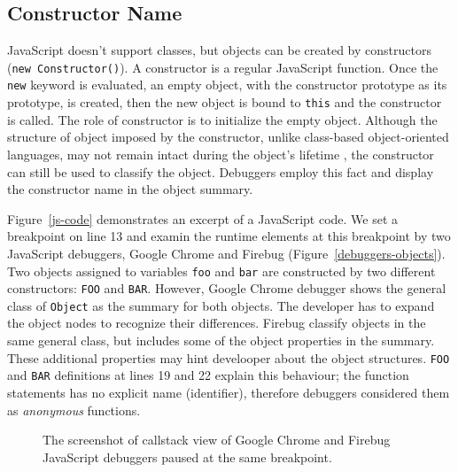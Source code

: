 \documentclass[conference]{IEEEtran}
\begin{document}
\subsection{Constructor Name}
JavaScript doesn't support classes, but objects can be created by constructors ({\small\texttt{new Constructor()}}). A constructor is a regular JavaScript function. Once the {\small\texttt{new}} keyword is evaluated, an empty object, with the constructor prototype as its prototype, is created, then the new object is bound to {\small\texttt{this}} and the constructor is called. The role of constructor is to initialize the empty object. Although the structure of object imposed by the constructor, unlike class-based object-oriented languages, may not remain intact during the object's lifetime \cite{Richards}, the constructor can still be used to classify the object. 
Debuggers employ this fact and display the constructor name in the object summary. 

Figure~\ref{js-code} demonstrates an excerpt of a JavaScript code. We set a breakpoint on line 13 and examin the runtime elements at this breakpoint by two JavaScript debuggers, Google Chrome and Firebug (Figure~\ref{debuggers-objects}). Two objects assigned to variables {\small\texttt{foo}} and {\small\texttt{bar}} are constructed by two different constructors: {\small\texttt{FOO}} and {\small\texttt{BAR}}. However, Google Chrome debugger shows the general class of {\small\texttt{Object}} as the summary for both objects. The developer has to expand the object nodes to recognize their differences. Firebug classify objects in the same general class, but includes some of the object properties in the summary. These additional properties may hint develooper about the object structures. {\small\texttt{FOO}} and {\small\texttt{BAR}} definitions at lines 19 and 22 explain this behaviour; the function statements has no explicit name (identifier), therefore debuggers considered them as \textit{anonymous} functions.

\begin{figure}[!t]
\centerline{
\hfil
{}}
\caption{The screenshot of callstack view of Google Chrome and Firebug JavaScript debuggers paused at the same breakpoint.}
\label{debuggers-callstack}
\end{figure}
\end{document}
